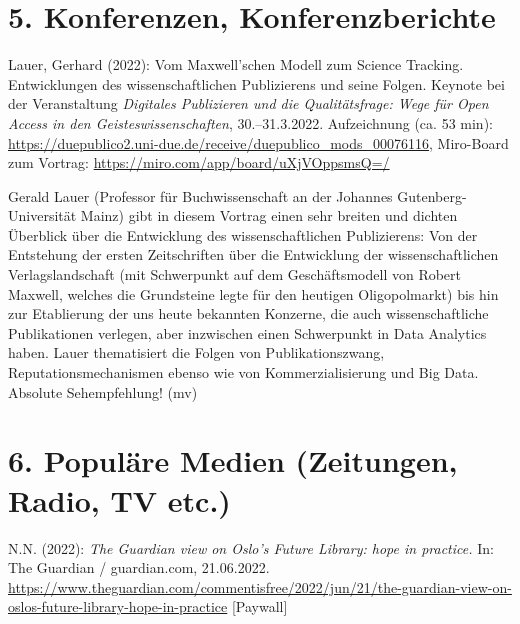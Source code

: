 \documentclass[a4paper,
fontsize=11pt,
oneside,
numbers=noperiodatend,
parskip=half-,
bibliography=totoc,
final
]{scrartcl}
\begin{document}
\hypertarget{konferenzen-konferenzberichte}{%
\section{5. Konferenzen,
Konferenzberichte}\label{konferenzen-konferenzberichte}}

Lauer, Gerhard (2022): Vom Maxwell'schen Modell zum Science Tracking.
Entwicklungen des wissenschaftlichen Publizierens und seine Folgen.
Keynote bei der Veranstaltung \emph{Digitales Publizieren und die
Qualitätsfrage: Wege für Open Access in den Geisteswissenschaften},
30.--31.3.2022. Aufzeichnung (ca. 53 min):
\url{https://duepublico2.uni-due.de/receive/duepublico_mods_00076116},
Miro-Board zum Vortrag: \url{https://miro.com/app/board/uXjVOppsmsQ=/}

Gerald Lauer (Professor für Buchwissenschaft an der Johannes
Gutenberg-Universität Mainz) gibt in diesem Vortrag einen sehr breiten
und dichten Überblick über die Entwicklung des wissenschaftlichen
Publizierens: Von der Entstehung der ersten Zeitschriften über die
Entwicklung der wissenschaftlichen Verlagslandschaft (mit Schwerpunkt
auf dem Geschäftsmodell von Robert Maxwell, welches die Grundsteine
legte für den heutigen Oligopolmarkt) bis hin zur Etablierung der uns
heute bekannten Konzerne, die auch wissenschaftliche Publikationen
verlegen, aber inzwischen einen Schwerpunkt in Data Analytics haben.
Lauer thematisiert die Folgen von Publikationszwang,
Reputationsmechanismen ebenso wie von Kommerzialisierung und Big Data.
Absolute Sehempfehlung! (mv)

\hypertarget{populuxe4re-medien-zeitungen-radio-tv-etc.}{%
\section{6. Populäre Medien (Zeitungen, Radio, TV
etc.)}\label{populuxe4re-medien-zeitungen-radio-tv-etc.}}

N.N. (2022): \emph{The Guardian view on Oslo's Future Library: hope in
practice.} In: The Guardian / guardian.com, 21.06.2022.
\url{https://www.theguardian.com/commentisfree/2022/jun/21/the-guardian-view-on-oslos-future-library-hope-in-practice}
{[}Paywall{]}
\end{document}
